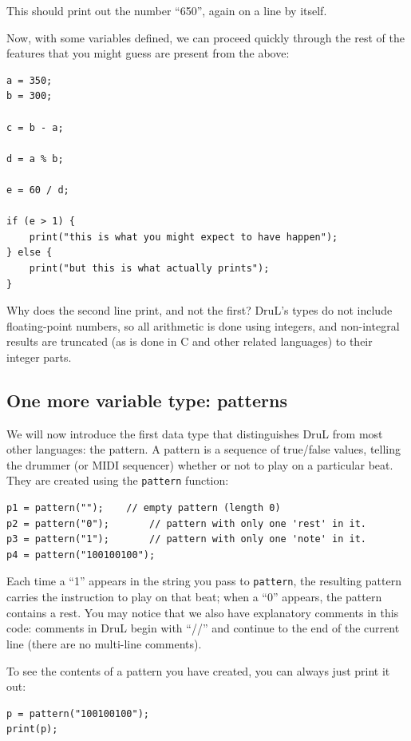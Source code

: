 This should print out the number ``650'', again on a line by itself.

Now, with some variables defined, we can proceed quickly through the rest of the features that
you might guess are present from the above:


\begin{lstlisting}
a = 350;
b = 300;

c = b - a;

d = a % b;

e = 60 / d;

if (e > 1) {
	print("this is what you might expect to have happen");
} else {
	print("but this is what actually prints");
}

\end{lstlisting}

Why does the second line print, and not the first?  DruL's types do not include floating-point numbers, so all arithmetic is done using integers, and non-integral results are truncated (as is done in C and other related languages) to their integer parts.

\subsection{One more variable type: patterns}

We will now introduce the first data type that distinguishes DruL from most other languages: the pattern.  A pattern is a sequence of true/false values, telling the drummer (or MIDI sequencer) whether or not to play on a particular beat.  They are created using the {\tt pattern} function:

\begin{lstlisting}
p1 = pattern("");	 // empty pattern (length 0)
p2 = pattern("0");       // pattern with only one 'rest' in it.
p3 = pattern("1");       // pattern with only one 'note' in it.
p4 = pattern("100100100");
\end{lstlisting}

Each time a ``1'' appears in the string you pass to {\tt pattern}, the resulting pattern carries the instruction to play on that beat; when a ``0'' appears, the pattern contains a rest.
You may notice that we also have explanatory comments in this code: comments in DruL begin with ``//'' and continue to the end of the current line (there are no multi-line comments).

To see the contents of a pattern you have created, you can always just print it out:

\begin{lstlisting}
p = pattern("100100100");
print(p);
\end{lstlisting}


